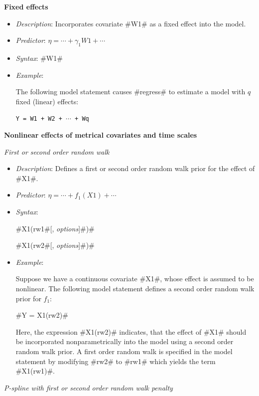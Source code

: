{\bf Fixed effects}
\medskip

\begin{itemize}
\item[] {\em Description}: Incorporates covariate #W1# as a fixed effect into the model.
\item[] {\em Predictor}: $\eta =  \cdots + \gamma_1 W1 + \cdots$
\item[] {\em Syntax}: #W1#
\item[] {\em Example}:

The following model statement causes #regress# to estimate a model
with $q$ fixed (linear) effects:

\texttt{Y = W1 + W2 + $\cdots$ + Wq}
\end{itemize}


{\bf Nonlinear effects of metrical covariates and time scales}
\medskip

{\em First or second order random walk}

\begin{itemize}
\item[] {\em Description}: Defines a first or second order random walk prior for the effect of #X1#.
\item[] {\em Predictor}: $\eta = \cdots + f_1(X1) + \cdots $
\item[] {\em Syntax}:

#X1(rw1#[, {\em options}]#)#

#X1(rw2#[, {\em options}]#)#
\item[] {\em Example}:

Suppose we have a continuous covariate #X1#, whose effect is
assumed to be nonlinear. The following model statement defines a
second order random walk prior for $f_1$:

#Y = X1(rw2)#

Here, the expression #X1(rw2)# indicates, that the effect of #X1#
should be incorporated nonparametrically into the model using a
second order random walk prior. A first order random walk is
specified in the model statement by modifying #rw2# to #rw1# which
yields the term #X1(rw1)#.
\end{itemize}

\vspace{0.5cm}

{\em P-spline with first or second order random walk penalty}

